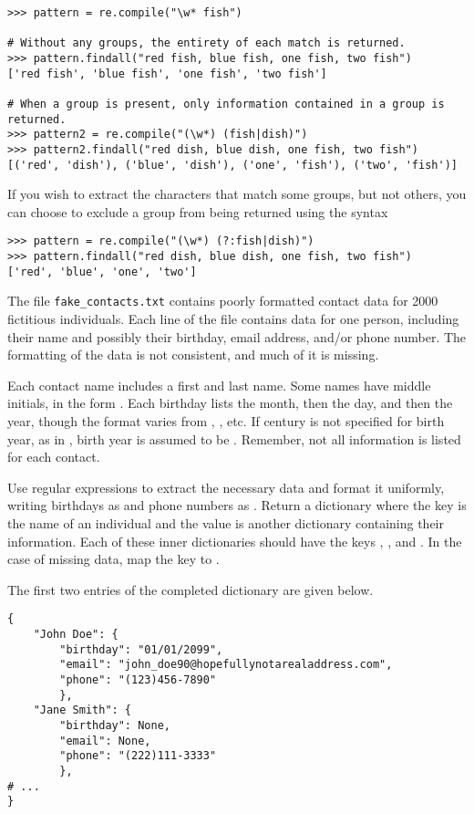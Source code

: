 \begin{lstlisting}
>>> pattern = re.compile("\w* fish")

# Without any groups, the entirety of each match is returned.
>>> pattern.findall("red fish, blue fish, one fish, two fish")
['red fish', 'blue fish', 'one fish', 'two fish']

# When a group is present, only information contained in a group is returned.
>>> pattern2 = re.compile("(\w*) (fish|dish)")
>>> pattern2.findall("red dish, blue dish, one fish, two fish")
[('red', 'dish'), ('blue', 'dish'), ('one', 'fish'), ('two', 'fish')]
\end{lstlisting}

If you wish to extract the characters that match some groups, but not others, you can choose to exclude a group from being returned using the syntax 

\begin{lstlisting}
>>> pattern = re.compile("(\w*) (?:fish|dish)")
>>> pattern.findall("red dish, blue dish, one fish, two fish")
['red', 'blue', 'one', 'two']
\end{lstlisting}


\begin{problem}
The file \texttt{fake\_contacts.txt} contains poorly formatted contact data for 2000 fictitious individuals.
Each line of the file contains data for one person, including their name and possibly their birthday, email address, and/or phone number.
The formatting of the data is not consistent, and much of it is missing.

Each contact name includes a first and last name. Some names have middle initials, in the form .
Each birthday lists the month, then the day, and then the year, though the format varies from , , etc.
If century is not specified for birth year, as in , birth year is assumed to be .
Remember, not all information is listed for each contact.

Use regular expressions to extract the necessary data and format it uniformly, writing birthdays as  and phone numbers as .
Return a dictionary where the key is the name of an individual and the value is another dictionary containing their information.
Each of these inner dictionaries should have the keys , , and .
In the case of missing data, map the key to .

The first two entries of the completed dictionary are given below.

\begin{lstlisting}
{
    "John Doe": {
        "birthday": "01/01/2099",
        "email": "john_doe90@hopefullynotarealaddress.com",
        "phone": "(123)456-7890"
        },
    "Jane Smith": {
        "birthday": None,
        "email": None,
        "phone": "(222)111-3333"
        },
# ...
}
\end{lstlisting}
\end{problem}


